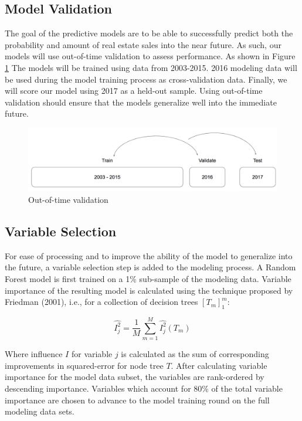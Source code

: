 \documentclass[12pt,]{article}
\begin{document}
\hypertarget{model-validation}{%
\subsection{Model Validation}\label{model-validation}}

The goal of the predictive models are to be able to successfully predict
both the probability and amount of real estate sales into the near
future. As such, our models will use out-of-time validation to assess
performance. As shown in Figure \ref{fig:Train Test Validate} The models
will be trained using data from 2003-2015. 2016 modeling data will be
used during the model training process as cross-validation data.
Finally, we will score our model using 2017 as a held-out sample. Using
out-of-time validation should ensure that the models generalize well
into the immediate future.

\begin{figure}[h]
\includegraphics[width=1\linewidth]{Sections/tables and figures/Train Validate Test} \caption{Out-of-time validation}\label{fig:Train Test Validate}
\end{figure}

\hypertarget{variable-selection}{%
\subsection{Variable Selection}\label{variable-selection}}

For ease of processing and to improve the ability of the model to
generalize into the future, a variable selection step is added to the
modeling process. A Random Forest model is first trained on a 1\%
sub-sample of the modeling data. Variable importance of the resulting
model is calculated using the technique proposed by Friedman (2001),
i.e., for a collection of decision trees \([T_m]_{1}^{m}\):

\[
  \hat{I_{j}^{2}} = \frac{1}{M} \sum_{m=1}^{M}\hat{I_{j}^{2}}(T_m)
\]

Where influence \(I\) for variable \(j\) is calculated as the sum of
corresponding improvements in squared-error for node tree \(T\). After
calculating variable importance for the model data subset, the variables
are rank-ordered by descending importance. Variables which account for
80\% of the total variable importance are chosen to advance to the model
training round on the full modeling data sets.
\end{document}
